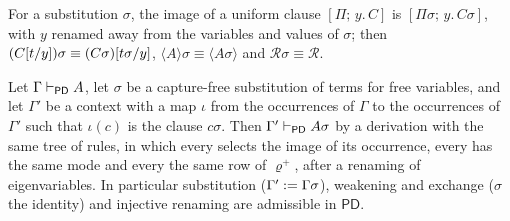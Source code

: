 For a substitution $\sigma$, the image of a uniform clause
$[\Pi;\,y.\,C]$ is $[\Pi\sigma;\,y.\,C\sigma]$, with $y$ renamed away from
the variables and values of $\sigma$; then
$(C[t/y])\sigma\equiv(C\sigma)[t\sigma/y]$,
$\langle A\rangle\sigma\equiv\langle A\sigma\rangle$ and
$\mathcal{R}\sigma\equiv\mathcal{R}$.

\begin{theorem}
\label{claus:thm:pdsubst}
Let $\Gamma\vdash_{\mathsf{PD}}A$, let $\sigma$ be a capture-free
substitution of terms for free variables, and let $\Gamma'$ be a context
with a map $\iota$ from the occurrences of $\Gamma$ to the occurrences of
$\Gamma'$ such that $\iota(c)$ is the clause $c\sigma$. Then
$\Gamma'\vdash_{\mathsf{PD}}A\sigma$ by a derivation with the same tree
of rules, in which every  selects the image of its
occurrence, every  has the same mode and every
 the same row of $\varrho^{+}$, after a renaming of
eigenvariables. In particular substitution ($\Gamma'\mathrel{:=}\Gamma\sigma$),
weakening and exchange ($\sigma$ the identity) and injective renaming are
admissible in $\mathsf{PD}$.
\end{theorem}
